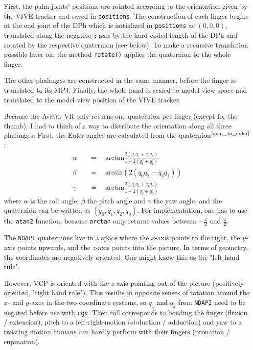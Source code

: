 \documentclass[hyperref, bachelorofscience]{cgvpub}
\newcommand{\newcite}[1]{$ ^{\text{\cite{#1}}} $}
\begin{document}
First, the palm joints' positions are rotated according to the orientation given by the \Gls{VIVE} tracker and saved in \lstinline|positions|. The construction of each finger begins at the end joint of the \gls{DPh} which is initialized in \lstinline|positions| as $ (0, 0, 0) $, translated along the negative $ z $-axis by the hard-coded length of the \gls{DPh} and rotated by the respective quaternion (see below). To make a recursive translation possible later on, the method \lstinline|rotate()| applies the quaternion to the whole finger.

The other phalanges are constructed in the same manner, before the finger is translated to its \gls{MPJ}. Finally, the whole hand is scaled to model view space and translated to the model view position of the \Gls{VIVE} tracker.

Because the Avatar VR only returns one quaternion per finger (except for the thumb), I had to think of a way to distribute the orientation along all three phalanges: First, the Euler angles are calculated from the quaternion\newcite{quat_to_euler}:
\begin{align*}
\alpha \quad&=\quad \mbox{arctan} \frac {2(q_0 q_1 + q_2 q_3)} {1 - 2(q_1^2 + q_2^2)} \\
\beta \quad&=\quad \mbox{arcsin} (2(q_0 q_2 - q_3 q_1)) \\
\gamma \quad&=\quad \mbox{arctan} \frac {2(q_0 q_3 + q_1 q_2)} {1 - 2(q_2^2 + q_3^2)}
\end{align*}
where $ \alpha $ is the roll angle, $ \beta $ the pitch angle and $ \gamma $ the yaw angle, and the quaternion can be written as $ (q_{0}, q_{1}, q_{2}, q_{3}) $. For implementation, one has to use the \lstinline|atan2| function, because \lstinline|arctan| only returns values between $ -\frac{\pi}{2} $ and $ \frac{\pi}{2} $.

The \lstinline|NDAPI| quaternions live in a space where the $ x $-axis points to the right, the $ y $-axis points upwards, and the $ z $-axis points into the picture. In terms of geometry, the coordinates are negatively oriented. One might know this as the "left hand rule". 

However, \gls{VCP} is oriented with the $ z $-axis pointing out of the picture (positively oriented, "right hand rule"). This results in opposite senses of rotation around the $ x $- and $ y $-axes in the two coordinate systems, so $ q_{1} $ and $ q_{2} $ from \lstinline|NDAPI| need to be negated before use with \lstinline|cgv|. Then roll corresponds to bending the finger (flexion / extension), pitch to a left-right-motion (abduction / adduction) and yaw to a twisting motion humans can hardly perform with their fingers (pronation / supination).
\end{document}
